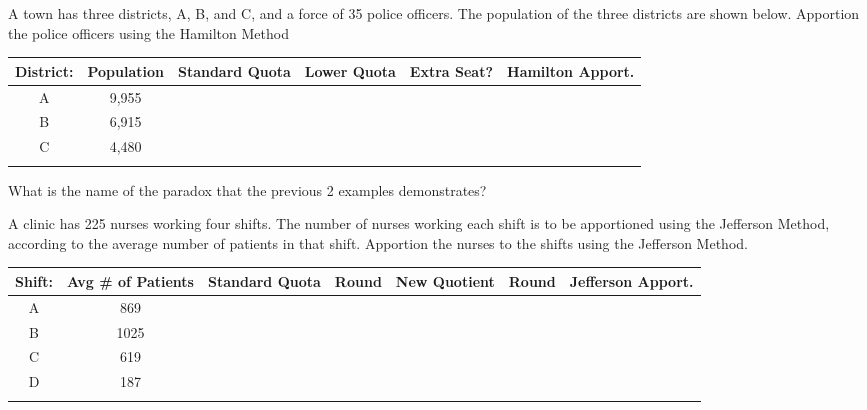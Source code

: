 \documentclass[11pt,epsfig]{article}
\begin{document}
\begin{problem}{10}
A town has three districts, A, B, and C, and a force of 35 police officers. The population of the three districts are shown below. Apportion the police officers using the Hamilton Method
 \begin{center}
 \begin{tabular}{ | c | c | c | c | c | c |}
   \hline
   District: & Population & Standard Quota & Lower Quota & Extra Seat? & Hamilton Apport.\\ \hline
   A & 9,955 &  &  &  &  \\ \hline
   B & 6,915 &  &  &  &  \\ \hline
   C & 4,480 &  &  &  &  \\ \hline
    &  &  &  &  &  \\ \hline
   \end{tabular}
  \end{center}

\vfill
\end{problem}

\begin{problem}{2}
What is the name of the paradox that the previous 2 examples demonstrates?

\vfill
\end{problem}

\newpage

\begin{problem}{10}
A clinic has 225 nurses working four shifts. The number of nurses working each shift is to be apportioned using the Jefferson Method, according to the average number of patients in that shift. Apportion the nurses to the shifts using the Jefferson Method.

 \begin{center}
 \begin{tabular}{ | c | c | c | c | c | c | c |}
   \hline
   Shift: & Avg \# of Patients & Standard Quota &Round&New Quotient& Round& Jefferson Apport.\\ \hline
   A & 869 &  &  &  & &  \\ \hline
   B & 1025 &  &  &  &  & \\ \hline
   C & 619 &  &  &  &  & \\ \hline
   D & 187 &  &  &  &  & \\ \hline
    &  &  &  &  &  & \\ \hline
   \end{tabular}
  \end{center}

\vfill
\end{problem}
\end{document}

